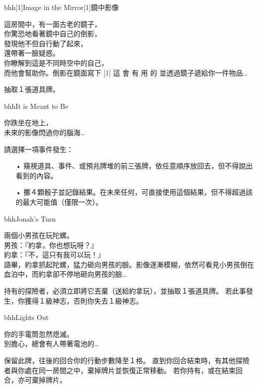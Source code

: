 \linebreak[0]%
\begin{EventCardSp}{bhh}{\scalebox{-1}[1]{Image in the Mirror}}{\scalebox{-1}[1]{鏡中影像}}
	\begin{CardStory}
		這房間中，有一面古老的鏡子，\\
		你驚恐地看著鏡中自己的倒影，\\
		發現他不但自行動了起來，\\
		還帶著一臉疑惑。\\
		你瞭解到這是不同時空中的自己，\\
		而他會幫助你。倒影在鏡面寫下\smallbreak
		\scalebox{-1}[1]{ \FontScript 這 \enskip 會 \enskip 有 \enskip 用 \enskip 的 }\smallbreak
		並透過鏡子遞給你一件物品…
	\end{CardStory}
	抽取１張道具牌。\smallbreak
\end{EventCardSp}%
\linebreak[0]%
\begin{EventCard}{bhh}{It is Meant to Be}
	\begin{CardStory}
		你跌坐在地上，\\
		未來的影像閃過你的腦海…
	\end{CardStory}
	請選擇一項事件發生：
	\begin{itemize}
		\item[•] 窺視道具、事件、或預兆牌堆的前三張牌，依任意順序放回去，但不得說出看到的內容。
		\item[•] 擲４顆骰子並記錄結果。在未來任何\RollAny{}，可直接使用這個結果，但不得超過該\RollAny{}的最大可能值（僅限一次）。
	\end{itemize}
\end{EventCard}%
\linebreak[0]%
\begin{EventCard}{bhh}{Jonah's Turn}
	\begin{CardStory}
		兩個小男孩在玩陀螺。\\
		男孩：『約拿，你也想玩呀？』\\
		約拿：『不，這只有我可以玩！』\\
		語畢，約拿抓起陀螺，猛力砸向男孩的臉。影像逐漸模糊，依然可看見小男孩倒在血泊中，而約拿卻不停地砸向男孩的臉…
	\end{CardStory}
	持有的探險者，必須立即將它丟棄（送給約拿玩），並抽取１張道具牌。\smallbreak
	若此事發生，你獲得１級神志，否則你失去１級神志。\smallbreak
\end{EventCard}%
\linebreak[0]%
\begin{EventCard}{bhh}{Lights Out}
	\begin{CardStory}
		你的手電筒忽然熄滅。\\
		別擔心，總會有人帶著電池的…
	\end{CardStory}
	保留此牌，往後的回合你的行動步數降至１格。\smallbreak
	直到你回合結束時，有其他探險者與你處在同一房間之中，棄掉牌片並恢復正常移動。\smallbreak
	若你持有，或在結束回合，亦可棄掉牌片。\smallbreak
\end{EventCard}%
